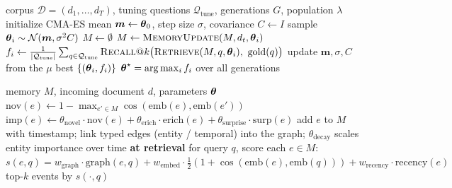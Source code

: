 \begin{algorithm}[t]
\caption{Corpus-cumulative CMA-ES tuning of $\thetavec$ (Stage 3)}
\label{alg:cmaes}
\begin{algorithmic}[1]
\Require corpus $\mathcal{D}=(d_1,\dots,d_T)$, tuning questions $\mathcal{Q}_{\text{tune}}$, generations $G$, population $\lambda$
\State initialize CMA-ES mean $\boldsymbol{m}\gets\boldsymbol{\theta}_0$, step size $\sigma$, covariance $C\gets I$
   
    \State sample $\boldsymbol{\theta}_i \sim \mathcal{N}(\boldsymbol{m}, \sigma^2 C)$
    \State $M \gets \emptyset$ 
     
      \State $M \gets \textsc{MemoryUpdate}(M, d_t, \boldsymbol{\theta}_i)$ 
    \EndFor
    \State $f_i \gets \frac{1}{|\mathcal{Q}_{\text{tune}}|}\sum_{q\in\mathcal{Q}_{\text{tune}}} \textsc{Recall@}k\big(\textsc{Retrieve}(M,q,\thetavec_i),\ \text{gold}(q)\big)$
  \EndFor
  \State update $\boldsymbol{m},\sigma,C$ from the $\mu$ best $\{(\boldsymbol{\theta}_i,f_i)\}$ 
\EndFor
\State \Return $\boldsymbol{\theta}^\star=\arg\max_i f_i$ over all generations
\end{algorithmic}
\end{algorithm}

\begin{algorithm}[t]
\caption{\textsc{MemoryUpdate}: per-event store / abstract / score, governed by $\thetavec$}
\label{alg:memory}
\begin{algorithmic}[1]
\Require memory $M$, incoming document $d$, parameters $\thetavec$
  \State $\text{nov}(e) \gets 1 - \max_{e'\in M}\cos(\mathrm{emb}(e),\mathrm{emb}(e'))$ 
  \State $\mathrm{imp}(e) \gets \theta_{\mathrm{novel}}\cdot\mathrm{nov}(e) + \theta_{\mathrm{erich}}\cdot\mathrm{erich}(e) + \theta_{\mathrm{surprise}}\cdot\mathrm{surp}(e)$ 
   
    \State add $e$ to $M$ with timestamp; link typed edges (entity / temporal) into the graph; $\theta_{\mathrm{decay}}$ scales entity importance over time
  \EndIf
\EndFor
\State \textbf{at retrieval} for query $q$, score each $e\in M$:
\State \quad $s(e,q) = w_{\mathrm{graph}}\cdot\mathrm{graph}(e,q) + w_{\mathrm{embed}}\cdot\tfrac{1}{2}(1+\cos(\mathrm{emb}(e),\mathrm{emb}(q))) + w_{\mathrm{recency}}\cdot\mathrm{recency}(e)$
\State \Return top-$k$ events by $s(\cdot,q)$
\end{algorithmic}
\end{algorithm}

